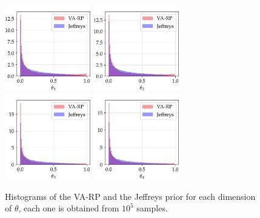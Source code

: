 \begin{figure}[h]
    \centering
    \includegraphics[width=3.75cm]{figures/va-rp/multi-prior_1.pdf}\hspace*{0.25cm}
    \includegraphics[width=3.75cm]{figures/va-rp/multi-prior_2.pdf}\hspace*{0.25cm}
    \includegraphics[width=3.75cm]{figures/va-rp/multi-prior_3.pdf}\hspace*{0.25cm}
    \includegraphics[width=3.75cm]{figures/va-rp/multi-prior_4.pdf}%
    \caption{Histograms of the VA-RP and the Jeffreys prior %
    for each dimension of $\theta$, each one is obtained from $10^5$ samples.}
    \label{fig:multi_prior}
\end{figure}

